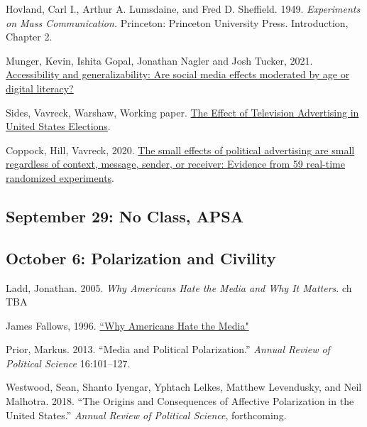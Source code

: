 \vspace{-.1in}\documentclass[11pt]{article}
\begin{document}
Hovland, Carl I., Arthur A. Lumsdaine, and Fred D. Sheffield. 1949. \emph{Experiments on Mass Communication.} Princeton: Princeton University Press. Introduction, Chapter 2. %


\noindent Munger, Kevin, Ishita Gopal, Jonathan Nagler and Josh Tucker, 2021. \href{https://journals.sagepub.com/doi/pdf/10.1177/20531680211016968}{Accessibility and generalizability: Are social media effects moderated by age or digital literacy?}



\noindent Sides, Vavreck, Warshaw, Working paper. \href{http://chriswarshaw.com/papers/advertising.pdf}{The Effect of Television Advertising in United States Elections}.

\noindent Coppock, Hill, Vavreck, 2020. \href{https://advances.sciencemag.org/content/6/36/eabc4046?intcmp=trendmd-adv}{The small effects of political advertising are small regardless of context, message, sender, or receiver: Evidence from 59 real-time randomized experiments}.
	



\subsection*{September 29: No Class, APSA}

\subsection*{October 6: Polarization and Civility}


Ladd, Jonathan. 2005. {\it Why Americans Hate the Media and Why It Matters}. ch TBA



\noindent James Fallows, 1996. \href{https://www.theatlantic.com/magazine/archive/1996/02/why-americans-hate-the-media/305060/}{``Why Americans Hate the Media"}


\noindent Prior, Markus. 2013. ``Media and Political Polarization.'' \emph{Annual Review of Political Science} 16:101--127.

\noindent Westwood, Sean, Shanto Iyengar, Yphtach Lelkes, Matthew Levendusky, and Neil Malhotra. 2018. ``The Origins and Consequences of Affective Polarization in the United States.'' \emph{Annual Review of Political Science}, forthcoming.



\end{document}
